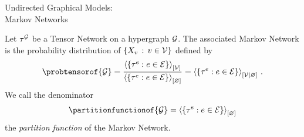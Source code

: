 \documentclass{beamer}
\begin{document}
\begin{frame}{Undirected Graphical Models:\\  
Markov Networks}


\begin{definition}
	Let $\tau^{\mathcal{G}}$ be a Tensor Network on a hypergraph $\mathcal{G}$.
	The associated Markov Network is the probability distribution of $\{X_{v}\,:\,v\in\mathcal{V}\}$ defined by 
		\[ \probtensorof{\graph} = \frac{
			\contractionof{\{\hypercoreof{\edge} : \edge \in \edges\}}{\nodes} 
		}{
			\contractionof{\{\hypercoreof{\edge} : \edge \in \edges\}}{\varnothing}
		} = \normalizationofwrt{\{\hypercoreof{\edge} : \edge \in \edges\}}{\nodes}{\varnothing} \, . \]
	We call the denominator
		\[\partitionfunctionof{\graph} = \contractionof{\{\hypercoreof{\edge} : \edge \in \edges\}}{\varnothing} \]
	the \emph{partition function} of the Markov Network.
\end{definition}

\end{frame}
\end{document}
